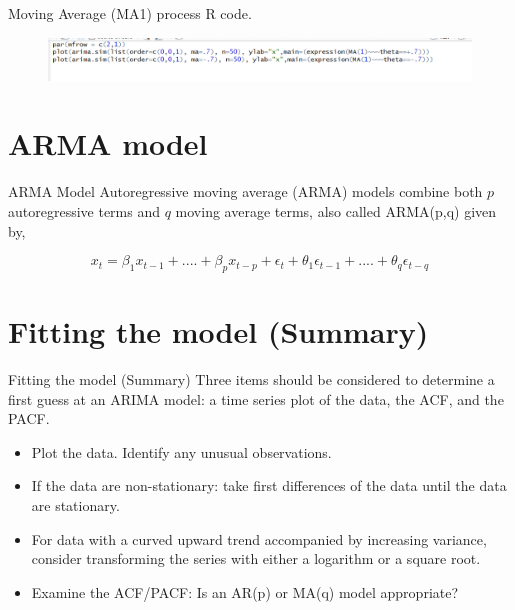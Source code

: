 \documentclass{beamer}
\begin{document}
\begin{frame}{Moving Average (MA1) process}
R code. 

\begin{figure}
\centering
\includegraphics[width=\linewidth]{rcode3}
\end{figure}
	
	
\end{frame}

\section{ARMA model}
\begin{frame}{ARMA Model}
Autoregressive moving average (ARMA) models combine both $ p $ autoregressive terms and $ q $ moving average terms, also called ARMA(p,q) given by,

\begin{equation}
x_t = \beta_1 x_{t-1}+ .... +\beta_p x_{t-p} + \epsilon_t + \theta_1 \epsilon_{t-1} + ....  + \theta_q \epsilon_{t-q}
\end{equation}




\end{frame}

\section{Fitting the model (Summary)}
\begin{frame}{Fitting the model (Summary)}
Three items should be considered to determine a first guess at an ARIMA model: a time series plot of the data, the ACF, and the PACF.

\begin{itemize}
\item  Plot the data. Identify any unusual observations.
\item If the data are non-stationary: take first differences of the data until the data are stationary. 
\item For data with a curved upward trend accompanied by increasing variance, consider transforming the series with either a logarithm or a square root.
\item Examine the ACF/PACF: Is an AR(p) or MA(q) model appropriate?

\end{itemize}


\end{frame}
	
\end{document}
